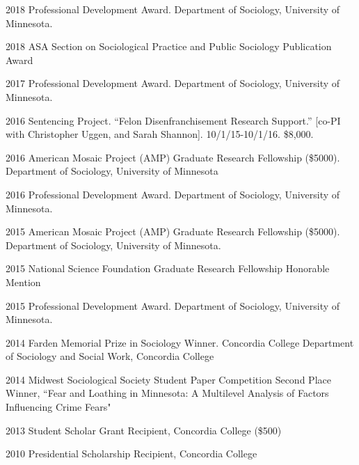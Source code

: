 \documentclass[letterpaper]{article}
\renewenvironment{itemize}{
  \begin{list}{}{
    \setlength{\leftmargin}{1.5em}
  }
}{
  \end{list}
}
\begin{document}
\begin{itemize}
\item 2018 Professional Development Award. Department of Sociology, University of Minnesota. 
\item 2018 ASA Section on Sociological Practice and Public Sociology Publication Award
\item 2017 Professional Development Award. Department of Sociology, University of Minnesota. 
\item 2016 Sentencing Project. “Felon Disenfranchisement Research Support.” [co-PI with Christopher Uggen, and Sarah Shannon]. 10/1/15-10/1/16. \$8,000.
\item 2016 American Mosaic Project (AMP) Graduate Research Fellowship (\$5000). Department of Sociology, University of Minnesota
\item 2016 Professional Development Award. Department of Sociology, University of Minnesota. 
\item 2015 American Mosaic Project (AMP) Graduate Research Fellowship (\$5000). Department of Sociology, University of Minnesota. 
\item 2015 National Science Foundation Graduate Research Fellowship Honorable Mention
\item 2015 Professional Development Award. Department of Sociology, University of Minnesota. 
\item 2014 Farden Memorial Prize in Sociology Winner. Concordia College Department of Sociology and Social Work, Concordia College
\item 2014 Midwest Sociological Society Student Paper Competition Second Place Winner,  ``Fear and Loathing in Minnesota: A Multilevel Analysis of Factors Influencing Crime Fears"
\item 2013 Student Scholar Grant Recipient, Concordia College (\$500)
\item 2010 Presidential Scholarship Recipient, Concordia College

\end{itemize}
\end{document}
